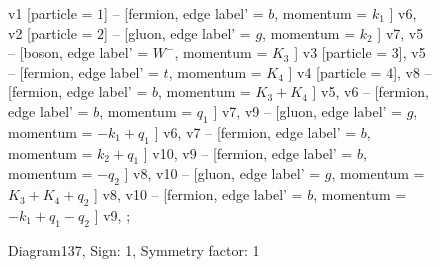 \documentclass{revtex4}
\begin{document}
\begin{figure}[!htb]
\begin{center}
{    %
v1 [particle = \(1\)] -- [fermion, edge label' = \(b\), momentum = \(k_{1}\) ] v6, 
v2 [particle = \(2\)] -- [gluon, edge label' = \(g\), momentum = \(k_{2}\) ] v7, 
v5 -- [boson, edge label' = \(W^{-}\), momentum = \(K_{3}\) ] v3 [particle = \(3\)], 
v5 -- [fermion, edge label' = \(t\), momentum = \(K_{4}\) ] v4 [particle = \(4\)], 
v8 -- [fermion, edge label' = \(b\), momentum = \(K_{3} + K_{4}\) ] v5, 
v6 -- [fermion, edge label' = \(b\), momentum = \(q_{1}\) ] v7, 
v9 -- [gluon, edge label' = \(g\), momentum = \(-k_{1} + q_{1}\) ] v6, 
v7 -- [fermion, edge label' = \(b\), momentum = \(k_{2} + q_{1}\) ] v10, 
v9 -- [fermion, edge label' = \(b\), momentum = \(-q_{2}\) ] v8, 
v10 -- [gluon, edge label' = \(g\), momentum = \(K_{3} + K_{4} + q_{2}\) ] v8, 
v10 -- [fermion, edge label' = \(b\), momentum = \(-k_{1} + q_{1} - q_{2}\) ] v9, 
};
\end{center}
\caption{Diagram137, Sign: 1, Symmetry factor: 1}
\end{figure}
\newpage
\end{document}
